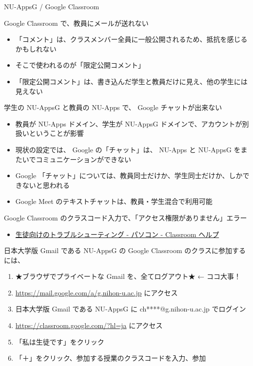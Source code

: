 \documentclass[a4j,10pt]{jsarticle}
\begin{document}
{\begin{frame}[label={sec:orgbe869cf},fragile]{NU-AppsG / Google Classroom}
\begin{block}{Google Classroom で、教員にメールが送れない}
\begin{itemize}
\item 「コメント」は、クラスメンバー全員に一般公開されるため、抵抗を感じるかもしれない
\item そこで使われるのが「限定公開コメント」
\item 「限定公開コメント」は、書き込んだ学生と教員だけに見え、他の学生には見えない
\end{itemize}
\end{block}
\par
\begin{block}{学生の NU-AppsG と教員の NU-Apps で、 Google チャットが出来ない}
\begin{itemize}
\item 教員が NU-Apps ドメイン、学生が NU-AppsG ドメインで、アカウントが別扱いということが影響
\item 現状の設定では、 Google の「チャット」は、 NU-Apps と NU-AppsG をまたいでコミュニケーションができない
\item Google 「チャット」については、教員同士だけか、学生同士だけか、しかできないと思われる
\item Google Meet のテキストチャットは、教員・学生混合で利用可能
\end{itemize}
\end{block}
\par
\begin{block}{Google Classroom のクラスコード入力で、「アクセス権限がありません」エラー}
\begin{itemize}
\item \href{https://support.google.com/edu/classroom/answer/6315899?co=GENIE.Platform\%3DDesktop\&hl=ja}{生徒向けのトラブルシューティング - パソコン - Classroom ヘルプ}
\end{itemize}
\par
日本大学版 Gmail である NU-AppsG の Google Classroom のクラスに参加するには、
\par
\begin{enumerate}
\item ★ブラウザでプライベートな Gmail を、全てログアウト★ ← ココ大事！
\item \url{https://mail.google.com/a/g.nihon-u.ac.jp} にアクセス
\item 日本大学版 Gmail である NU-AppsG に ch****@g.nihon-u.ac.jp でログイン
\item \url{https://classroom.google.com/?hl=ja} にアクセス
\item 「私は生徒です」をクリック
\item 「＋」をクリック、参加する授業のクラスコードを入力、参加

\end{enumerate}
\end{block}
\end{frame}}
\end{document}
